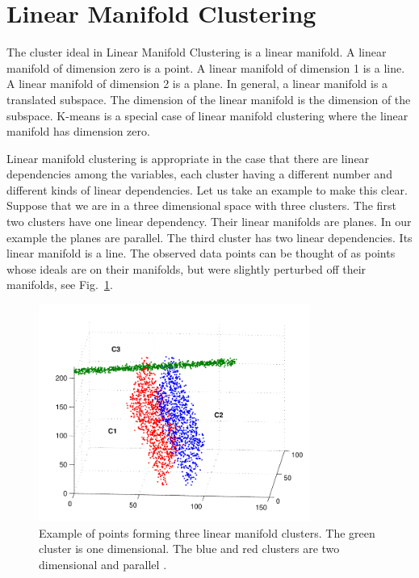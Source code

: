 \section{Linear Manifold Clustering}
\label{sc:lmclus}

The cluster ideal in Linear Manifold Clustering is a linear manifold.
A linear manifold of dimension zero is a point. A linear manifold of dimension 1
is a line. A linear manifold of dimension 2 is a plane. In general,
a linear manifold is a translated subspace.
The dimension of the linear manifold is the dimension of the subspace.
K-means is a special case of linear manifold clustering where
the linear manifold has dimension zero.

Linear manifold clustering is appropriate in the case that there are
linear dependencies among the variables, each cluster having a different number
and different kinds of linear dependencies.
Let us take an example to make this clear.  Suppose that we are in a three
dimensional space with three clusters. The first two clusters have one linear
dependency. Their  linear manifolds  are planes.
In our example the planes are parallel. The third cluster has
two linear dependencies. Its linear manifold is a line. The observed data points
can be thought of as points whose ideals are on their manifolds, but were
slightly perturbed off their manifolds, see Fig.~\ref{fig:lm-demo}.

\begin{figure}[h]
\centering
\includegraphics[width=3.5in]{img/LmDemo}
\caption{Example of points forming three linear manifold clusters.
The green cluster is one dimensional. The blue and red clusters are
two dimensional and parallel \cite{Haralick:2007rt}.}
\label{fig:lm-demo}
\end{figure}

